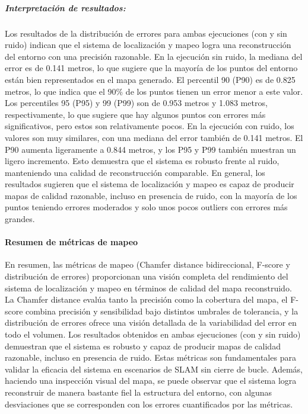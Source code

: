 \documentclass[12pt, a4paper, twoside]{article}
\begin{document}
\subparagraph{Interpretación de resultados:}
Los resultados de la distribución de errores para ambas ejecuciones (con y sin ruido) indican que el sistema de localización y mapeo logra una reconstrucción del entorno con una precisión razonable.
En la ejecución sin ruido, la mediana del error es de 0.141 metros, lo que sugiere que la mayoría de los puntos del entorno están bien representados en el mapa generado.
El percentil 90 (P90) es de 0.825 metros, lo que indica que el 90\% de los puntos tienen un error menor a este valor.
Los percentiles 95 (P95) y 99 (P99) son de 0.953 metros y 1.083 metros, respectivamente, lo que sugiere que hay algunos puntos con errores más significativos, pero estos son relativamente pocos.\newline
En la ejecución con ruido, los valores son muy similares, con una mediana del error también de 0.141 metros.
El P90 aumenta ligeramente a 0.844 metros, y los P95 y P99 también muestran un ligero incremento.
Esto demuestra que el sistema es robusto frente al ruido, manteniendo una calidad de reconstrucción comparable.
En general, los resultados sugieren que el sistema de localización y mapeo es capaz de producir mapas de calidad razonable, incluso en presencia de ruido, con la mayoría de los puntos teniendo errores moderados 
y solo unos pocos outliers con errores más grandes.

\paragraph{Resumen de métricas de mapeo}
En resumen, las métricas de mapeo (Chamfer\cite{Fan2020Chamfer} distance bidireccional, F-score\cite{Caccia2018FScore} y distribución de errores) proporcionan una visión completa del rendimiento del sistema de localización y mapeo en términos de calidad del mapa reconstruido.
La Chamfer\cite{Fan2020Chamfer} distance evalúa tanto la precisión como la cobertura del mapa, el F-score\cite{Caccia2018FScore} combina precisión y sensibilidad bajo distintos umbrales de tolerancia, y la distribución de errores ofrece una visión detallada de la variabilidad del error en todo el volumen.
Los resultados obtenidos en ambas ejecuciones (con y sin ruido) demuestran que el sistema es robusto y capaz de producir mapas de calidad razonable, incluso en presencia de ruido.
Estas métricas son fundamentales para validar la eficacia del sistema en escenarios de SLAM\cite{smith1987slam} sin cierre de bucle. Además, haciendo una inspección visual del mapa, se puede observar que el sistema logra reconstruir de manera bastante fiel la estructura del entorno,
con algunas desviaciones que se corresponden con los errores cuantificados por las métricas.
\end{document}
